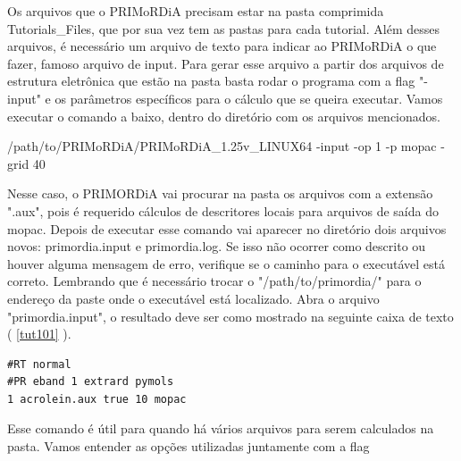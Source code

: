 \documentclass[a4paper,11pt]{refart}
\begin{document}
Os arquivos que o PRIMoRDiA precisam estar na pasta comprimida Tutorials\_Files, que por sua vez tem as pastas para cada tutorial. Além desses arquivos, é necessário um arquivo de texto para indicar ao PRIMoRDiA o que fazer, famoso arquivo de input. Para gerar esse arquivo a partir dos arquivos de estrutura eletrônica que estão na pasta basta rodar o programa com a flag "-input" e os parâmetros específicos para o cálculo que se queira executar. Vamos executar o comando a baixo, dentro do diretório com os arquivos mencionados.

\hspace*{-\leftmarginwidth}
\begin{minipage}{\fullwidth}
\begin{commandshell}/path/to/PRIMoRDiA/PRIMoRDiA_1.25v_LINUX64 -input -op 1 -p mopac -grid 40\end{commandshell}
\end{minipage}

Nesse caso, o PRIMORDiA vai procurar na pasta os arquivos com a extensão ".aux", pois é requerido cálculos de descritores locais para arquivos de saída do mopac. Depois de executar esse comando vai aparecer no diretório dois arquivos novos: primordia.input e primordia.log. Se isso não ocorrer como descrito ou houver alguma mensagem de erro, verifique se o caminho para o executável está correto. Lembrando que é necessário trocar o "/path/to/primordia/" para o endereço da paste onde o executável está localizado. Abra o arquivo "primordia.input", o resultado deve ser como mostrado na seguinte caixa de texto ( \autoref{tut101} ).

\begin{minipage}{\textwidth}
\begin{lstlisting}[caption={Input gerado pelo comando do PRIMoRDiA.},label={tut101}]
#RT normal 
#PR eband 1 extrard pymols
1 acrolein.aux true 10 mopac 
\end{lstlisting}
\end{minipage}


Esse comando é útil para quando há vários arquivos para serem calculados na pasta. Vamos entender as opções utilizadas juntamente com a flag
\end{document}
